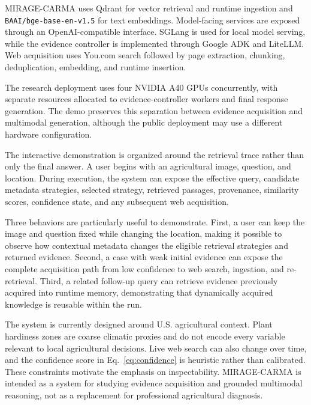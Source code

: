\documentclass[runningheads]{llncs}
\begin{document}
MIRAGE-CARMA uses Qdrant for vector retrieval and runtime ingestion and \texttt{BAAI/bge-base-en-v1.5} for text embeddings. Model-facing services are exposed through an OpenAI-compatible interface. SGLang is used for local model serving, while the evidence controller is implemented through Google ADK and LiteLLM. Web acquisition uses You.com search followed by page extraction, chunking, deduplication, embedding, and runtime insertion.

The research deployment uses four NVIDIA A40 GPUs concurrently, with separate resources allocated to evidence-controller workers and final response generation. The demo preserves this separation between evidence acquisition and multimodal generation, although the public deployment may use a different hardware configuration.


The interactive demonstration is organized around the retrieval trace rather than only the final answer. A user begins with an agricultural image, question, and location. During execution, the system can expose the effective query, candidate metadata strategies, selected strategy, retrieved passages, provenance, similarity scores, confidence state, and any subsequent web acquisition.

Three behaviors are particularly useful to demonstrate. First, a user can keep the image and question fixed while changing the location, making it possible to observe how contextual metadata changes the eligible retrieval strategies and returned evidence. Second, a case with weak initial evidence can expose the complete acquisition path from low confidence to web search, ingestion, and re-retrieval. Third, a related follow-up query can retrieve evidence previously acquired into runtime memory, demonstrating that dynamically acquired knowledge is reusable within the run.


The system is currently designed around U.S. agricultural context. Plant hardiness zones are coarse climatic proxies and do not encode every variable relevant to local agricultural decisions. Live web search can also change over time, and the confidence score in Eq.~\ref{eq:confidence} is heuristic rather than calibrated. These constraints motivate the emphasis on inspectability. MIRAGE-CARMA is intended as a system for studying evidence acquisition and grounded multimodal reasoning, not as a replacement for professional agricultural diagnosis.
\end{document}
